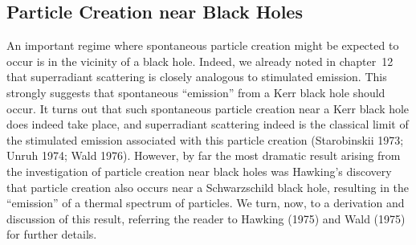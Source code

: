
\subsection{Particle Creation near Black Holes}\label{sec:14.3}

An important regime where spontaneous particle creation might be expected to occur
is in the vicinity of a black hole. Indeed, we already noted in chapter~12 that
superradiant scattering is closely analogous to stimulated emission. This strongly
suggests that spontaneous ``emission'' from a Kerr black hole should occur. It turns
out that such spontaneous particle creation near a Kerr black hole does indeed take
place, and superradiant scattering indeed is the classical limit of the stimulated
emission associated with this particle creation (Starobinskii 1973; Unruh 1974;
Wald 1976). However, by far the most dramatic result arising from the investigation
of particle creation near black holes was Hawking's discovery that particle creation
also occurs near a Schwarzschild black hole, resulting in the ``emission'' of a thermal
spectrum of particles. We turn, now, to a derivation and discussion of this result,
referring the reader to Hawking (1975) and Wald (1975) for further details.

